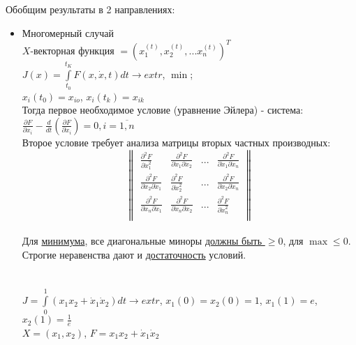 \documentclass[preprint,russian,a5paper,10pt,twoside]{ncc}
\begin{document}
Обобщим результаты в 2 направлениях:
\begin{itemize}
\item Многомерный случай
\\$X$-векторная функция $={{\left( x_{1}^{\left( t \right)},x_{2}^{\left( t \right)},...x_{n}^{\left( t \right)} \right)}^{T}}$ 
\\$J\left( x \right)=\int\limits_{{{t}_{0}}}^{{{t}_{K}}}{F\left( x,\dot{x},t \right)}dt\to extr$, $\min $;
\\${{x}_{i}}\left( {{t}_{0}} \right)={{x}_{io}}$, ${{x}_{i}}\left( {{t}_{k}} \right)={{x}_{ik}}$
\\Тогда первое необходимое условие (уравнение Эйлера) - система: $\frac{\partial F}{\partial {{x}_{i}}}-\frac{d}{dt}\left( \frac{\partial F}{\partial {{{\dot{x}}}_{i}}} \right)=0,i=\overline{1,n}$ 
\\Второе условие требует анализа матрицы вторых частных производных:
\[\left\| \begin{array}{*{35}{l}}
   \frac{{{\partial }^{2}}F}{\partial \dot{x}_{1}^{2}} & \frac{{{\partial }^{2}}F}{\partial {{{\dot{x}}}_{1}}\partial {{{\dot{x}}}_{2}}} & ... & \frac{{{\partial }^{2}}F}{\partial {{{\dot{x}}}_{1}}\partial {{{\dot{x}}}_{n}}}  \\
   \frac{{{\partial }^{2}}F}{\partial {{{\dot{x}}}_{2}}\partial {{{\dot{x}}}_{1}}} & \frac{{{\partial }^{2}}F}{\partial \dot{x}_{2}^{2}} & ... & \frac{{{\partial }^{2}}F}{\partial {{{\dot{x}}}_{2}}\partial {{{\dot{x}}}_{n}}}  \\
   \frac{{{\partial }^{2}}F}{\partial {{{\dot{x}}}_{n}}\partial {{{\dot{x}}}_{1}}} & \frac{{{\partial }^{2}}F}{\partial {{{\dot{x}}}_{n}}\partial {{{\dot{x}}}_{2}}} & ... & \frac{{{\partial }^{2}}F}{\partial \dot{x}_{n}^{2}}  \\
\end{array} \right\|\]
\\Для \underline{минимума}, все диагональные миноры \underline{должны быть $\ge 0$}, для \underline{$\max \le 0$}. Строгие неравенства дают и \underline{достаточность} условий.
\\
\\
\\$J=\int\limits_{0}^{1}{\left( {{x}_{1}}{{x}_{2}}+{{{\dot{x}}}_{1}}{{{\dot{x}}}_{2}} \right)}dt\to extr$, ${{x}_{1}}\left( 0 \right)={{x}_{2}}\left( 0 \right)=1$, ${{x}_{1}}\left( 1 \right)=e$, ${{x}_{2}}\left( 1 \right)=\frac{1}{e}$ 
\\$X=\left( {{x}_{1}},{{x}_{2}} \right)$, $F={{x}_{1}}{{x}_{2}}+{{\dot{x}}_{1}}{{\dot{x}}_{2}}$

\end{itemize}
\end{document}
